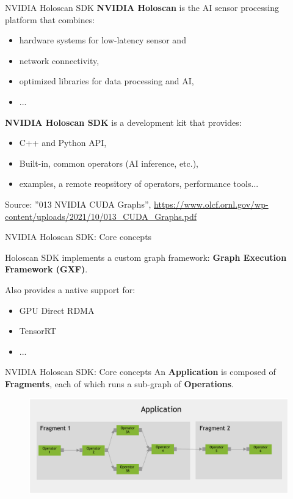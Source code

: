 \documentclass[xcolor=table]{beamer}
\begin{document}
\begin{frame}{NVIDIA Holoscan SDK}
  \textbf{NVIDIA Holoscan} is the AI sensor processing platform that combines:
  \begin{itemize}
  \item hardware systems for low-latency sensor and
  \item network connectivity,
  \item optimized libraries for data processing and AI,
  \item ...
  \end{itemize}  

  \textbf{NVIDIA Holoscan SDK} is a development kit that provides:
  \begin{itemize}
  \item C++ and Python API,
  \item Built-in, common operators (AI inference, etc.),
  \item examples, a remote reopsitory of operators, performance tools...  
  \end{itemize}  

  \footnotesize Source: ''013 NVIDIA CUDA Graphs'', \url{https://www.olcf.ornl.gov/wp-content/uploads/2021/10/013_CUDA_Graphs.pdf}
\end{frame}


\begin{frame}{NVIDIA Holoscan SDK: Core concepts}

  Holoscan SDK implements a custom graph framework: \textbf{Graph Execution
    Framework (GXF)}.

  Also provides a native support for:
  \begin{itemize}
  \item GPU Direct RDMA
  \item TensorRT
  \item ...  
  \end{itemize}  
  
\end{frame}

\begin{frame}{NVIDIA Holoscan SDK: Core concepts}
  An \textbf{Application} is composed of \textbf{Fragments}, each of which runs
  a sub-graph of \textbf{Operations}.

  \begin{figure}
    \includegraphics[scale=0.2]{imgs/holoscan_application.png}
  \end{figure}
  
\end{frame}
\end{document}
